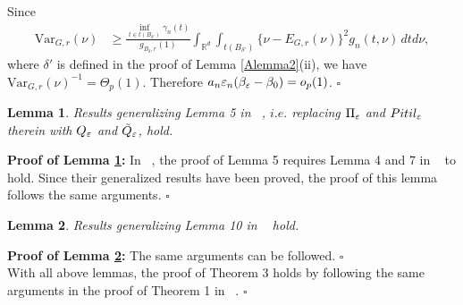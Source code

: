 \documentclass{article}
\newtheorem{lemma}{Lemma}
\begin{document}
	Since
	\begin{align*}
	\text{Var}_{G,r}(\nu) & \geq\frac{\inf_{t\in t(B_{\delta'})}\gamma_{n}(t)}{g_{B_{\delta},r}(1)}\int_{\mathbb{R}^{d}}\int_{t(B_{\delta'})}\{\nu-E_{G,r}(\nu)\}^{2}g_{n}(t,\nu)\,dtd\nu,
	\end{align*}
	where $\delta'$ is defined in the proof of Lemma \ref{Alemma2}(ii),
	we have $\text{Var}_{G,r}(\nu)^{-1}=\Theta_{p}(1)$. Therefore $a_{n}\varepsilon_{n}(\beta_{\varepsilon}-\beta_{0})=o_{p}(1)$.
	\hfill{$\square$} 

\begin{lemma}\label{Alemma6} Results generalizing Lemma 5 in ~\cite{Li2017},
	$i.e.$ replacing $\Pi_{\varepsilon}$ and $\\Pitil_{\varepsilon}$ therein with
	$Q_{\varepsilon}$ and $\tilde{Q}_{\varepsilon}$, hold. \end{lemma} 
{\bf Proof of Lemma \ref{Alemma6}:} 
	In ~\cite{Li2017}, the proof of Lemma 5 requires Lemma 4 and 7 in
	~\cite{Li2017} to hold. Since their generalized results have been
	proved, the proof of this lemma follows the same arguments.
	\hfill{$\square$} 

\begin{lemma}\label{Alemma7} Results generalizing Lemma 10 in ~\cite{Li2017}
	hold. \end{lemma}
{\bf Proof of Lemma \ref{Alemma7}:} 
	The same arguments can be followed.
	\hfill{$\square$} \\

With all above lemmas, the proof of Theorem 3 holds by following the same arguments in the proof of Theorem
1 in ~\cite{Li2017}.
	\hfill{$\square$} 

	

	
\end{document}

